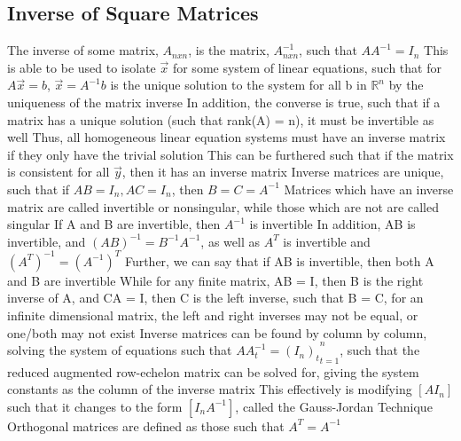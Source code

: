 \documentclass[11 pt, twoside]{article}
\newenvironment{outline*}
{
	\begin{outline}[enumerate]
	}
	{\end{outline}
}
\begin{document}
\subsection{Inverse of Square Matrices}
\begin{outline*}
\1 The inverse of some matrix, $A_{nxn}$, is the matrix, $A^{-1}_{nxn}$, such that $AA^{-1} = I_n$
\2 This is able to be used to isolate $\vec{x}$ for some system of linear equations, such that for $A\vec{x} = b$, $\vec{x} = A^{-1}b$ is the unique solution to the system for all b in $\mathbb{R}^n$ by the uniqueness of the matrix inverse
\3 In addition, the converse is true, such that if a matrix has a unique solution (such that rank(A) = n), it must be invertible as well
\3 Thus, all homogeneous linear equation systems must have an inverse matrix if they only have the trivial solution
\3 This can be furthered such that if the matrix is consistent for all $\vec{y}$, then it has an inverse matrix
\2 Inverse matrices are unique, such that if $AB = I_n, AC = I_n$, then $B = C = A^{-1}$
\2 Matrices which have an inverse matrix are called invertible or nonsingular, while those which are not are called singular
\2 If A and B are invertible, then $A^{-1}$ is invertible
\3 In addition, AB is invertible, and $(AB)^{-1} = B^{-1}A^{-1}$, as well as $A^T$ is invertible and $(A^T)^{-1} = (A^{-1})^T$
\3 Further, we can say that if AB is invertible, then both A and B are invertible
\2 While for any finite matrix, AB = I, then B is the right inverse of A, and CA = I, then C is the left inverse, such that B = C, for an infinite dimensional matrix, the left and right inverses may not be equal, or one/both may not exist
\1 Inverse matrices can be found by column by column, solving the system of equations such that ${AA^{-1}_t = (I_n)_t}_{t=1}^n$, such that the reduced augmented row-echelon matrix can be solved for, giving the system constants as the column of the inverse matrix
\2 This effectively is modifying $[A I_n]$ such that it changes to the form $[I_n A^{-1}]$, called the Gauss-Jordan Technique
\1 Orthogonal matrices are defined as those such that $A^T = A^{-1}$
\end{outline*}
\end{document}
